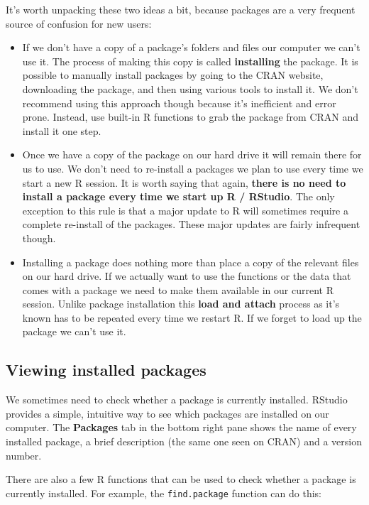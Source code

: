 \documentclass[
]{book}
\begin{document}
It's worth unpacking these two ideas a bit, because packages are a very frequent source of confusion for new users:

\begin{itemize}
\item
  If we don't have a copy of a package's folders and files our computer we can't use it. The process of making this copy is called \textbf{installing} the package. It is possible to manually install packages by going to the CRAN website, downloading the package, and then using various tools to install it. We don't recommend using this approach though because it's inefficient and error prone. Instead, use built-in R functions to grab the package from CRAN and install it one step.
\item
  Once we have a copy of the package on our hard drive it will remain there for us to use. We don't need to re-install a packages we plan to use every time we start a new R session. It is worth saying that again, \textbf{there is no need to install a package every time we start up R / RStudio}. The only exception to this rule is that a major update to R will sometimes require a complete re-install of the packages. These major updates are fairly infrequent though.
\item
  Installing a package does nothing more than place a copy of the relevant files on our hard drive. If we actually want to use the functions or the data that comes with a package we need to make them available in our current R session. Unlike package installation this \textbf{load and attach} process as it's known has to be repeated every time we restart R. If we forget to load up the package we can't use it.
\end{itemize}

\hypertarget{viewing-installed-packages}{%
\subsection{Viewing installed packages}\label{viewing-installed-packages}}

We sometimes need to check whether a package is currently installed. RStudio provides a simple, intuitive way to see which packages are installed on our computer. The \textbf{Packages} tab in the bottom right pane shows the name of every installed package, a brief description (the same one seen on CRAN) and a version number.

There are also a few R functions that can be used to check whether a package is currently installed. For example, the \texttt{find.package} function can do this:
\end{document}
